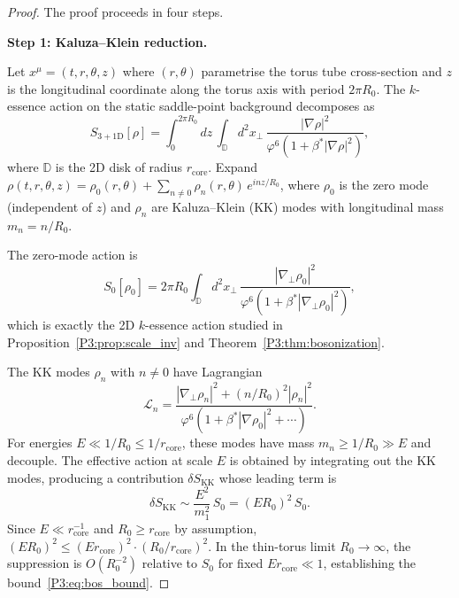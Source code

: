 \documentclass[11pt,a4paper]{article}
\theoremstyle{definition}
\theoremstyle{remark}
\newcommand{\vp}{\varphi}
\newcommand{\bst}{\beta^{*}}
\begin{document}
\begin{proof}
The proof proceeds in four steps.

\medskip
\textbf{Step 1: Kaluza--Klein reduction.}

Let $x^\mu = (t, r, \theta, z)$ where $(r,\theta)$ parametrise the torus
tube cross-section and $z$ is the longitudinal coordinate along the torus
axis with period $2\pi R_0$.
The $k$-essence action on the static saddle-point background decomposes as
\begin{equation}
  S_{3+1\mathrm{D}}[\rho]
  = \int_0^{2\pi R_0}\!dz\,\int_{\mathbb{D}}\!d^2x_\perp\,
    \frac{|\nabla\rho|^2}{\vp^6(1+\bst|\nabla\rho|^2)},
\end{equation}
where $\mathbb{D}$ is the 2D disk of radius $r_{\mathrm{core}}$.
Expand $\rho(t,r,\theta,z) = \rho_0(r,\theta) + \sum_{n\neq0}\rho_n(r,\theta)\,e^{inz/R_0}$,
where $\rho_0$ is the zero mode (independent of $z$) and $\rho_n$ are
Kaluza--Klein (KK) modes with longitudinal mass $m_n = n/R_0$.

The zero-mode action is
\begin{equation}
  S_0[\rho_0]
  = 2\pi R_0\int_{\mathbb{D}}\!d^2x_\perp\,
    \frac{|\nabla_\perp\rho_0|^2}{\vp^6(1+\bst|\nabla_\perp\rho_0|^2)},
\end{equation}
which is exactly the 2D $k$-essence action studied in
Proposition~\ref{P3:prop:scale_inv} and Theorem~\ref{P3:thm:bosonization}.

The KK modes $\rho_n$ with $n\neq0$ have Lagrangian
\begin{equation}
  \mathcal{L}_n
  = \frac{|\nabla_\perp\rho_n|^2 + (n/R_0)^2|\rho_n|^2}
         {\vp^6(1+\bst|\nabla\rho_0|^2 + \cdots)}.
\end{equation}
For energies $E \ll 1/R_0 \leq 1/r_{\mathrm{core}}$, these modes have mass
$m_n \geq 1/R_0 \gg E$ and decouple.
The effective action at scale $E$ is obtained by integrating out the KK
modes, producing a contribution $\delta S_{\mathrm{KK}}$ whose leading term is
\begin{equation}
  \delta S_{\mathrm{KK}} \sim \frac{E^2}{m_1^2}\,S_0 = (E R_0)^2\,S_0.
\end{equation}
Since $E \ll r_{\mathrm{core}}^{-1}$ and $R_0 \geq r_{\mathrm{core}}$ by
assumption, $(ER_0)^2 \leq (E r_{\mathrm{core}})^2 \cdot (R_0/r_{\mathrm{core}})^2$.
In the thin-torus limit $R_0 \to \infty$, the suppression is $O(R_0^{-2})$
relative to $S_0$ for fixed $E r_{\mathrm{core}} \ll 1$, establishing the
bound~\eqref{P3:eq:bos_bound}.


\end{proof}
\end{document}
